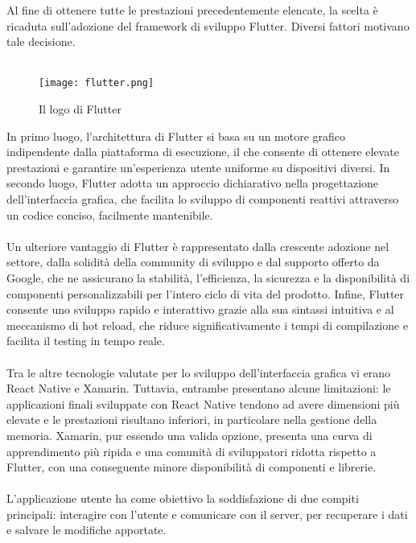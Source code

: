 Al fine di ottenere tutte le prestazioni precedentemente elencate, 
la scelta è ricaduta sull’adozione del framework di sviluppo Flutter.
Diversi fattori motivano tale decisione. \\
\\
\begin{wrapfigure}{r}{0.3\textwidth}
    \centering
    \texttt{[image: flutter.png]}
    \caption{Il logo di Flutter}
\end{wrapfigure}
In primo luogo, l'architettura di Flutter si basa su un motore grafico 
indipendente dalla piattaforma di esecuzione,
il che consente di ottenere elevate prestazioni e 
garantire un'esperienza utente uniforme su dispositivi diversi.
In secondo luogo, Flutter adotta un approccio dichiarativo nella progettazione dell'interfaccia grafica,
che facilita lo sviluppo di componenti reattivi attraverso un codice conciso, facilmente mantenibile.\\
\\
Un ulteriore vantaggio di Flutter è rappresentato dalla crescente adozione nel settore,
dalla solidità della community di sviluppo e dal supporto offerto da Google,
che ne assicurano la stabilità, l'efficienza, la sicurezza e la disponibilità 
di componenti personalizzabili per l'intero ciclo di vita del prodotto.
Infine, Flutter consente uno sviluppo rapido e interattivo 
grazie alla sua sintassi intuitiva e al meccanismo di hot reload,
che riduce significativamente i tempi di compilazione e facilita il testing in tempo reale.\\
\\	
Tra le altre tecnologie valutate per lo sviluppo dell'interfaccia grafica vi erano React Native e Xamarin.
Tuttavia, entrambe presentano alcune limitazioni: 
le applicazioni finali sviluppate con React Native tendono ad avere dimensioni più elevate e le prestazioni risultano inferiori,
in particolare nella gestione della memoria.
Xamarin, pur essendo una valida opzione, presenta una curva di apprendimento più ripida e 
una comunità di sviluppatori ridotta rispetto a Flutter,
con una conseguente minore disponibilità di componenti e librerie.\\
\\
L'applicazione utente ha come obiettivo la soddisfazione di due compiti principali: 
interagire con l'utente e comunicare con il server, 
per recuperare i dati e salvare le modifiche apportate.\\
\\

